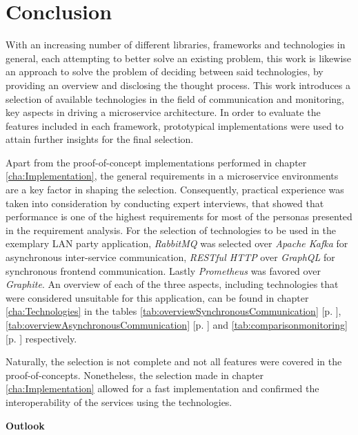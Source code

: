 
\chapter{Conclusion}\label{cha:Conclusion}

With an increasing number of different libraries, frameworks and technologies in general, each attempting to better solve an existing problem, this work is likewise an approach to solve the problem of deciding between said technologies, by providing an overview and disclosing the thought process.
This work introduces a selection of available technologies in the field of communication and monitoring, key aspects in driving a microservice architecture.
In order to evaluate the features included in each framework, prototypical implementations were used to attain further insights for the final selection.

Apart from the proof-of-concept implementations performed in chapter \ref{cha:Implementation}, the general requirements in a microservice environments are a key factor in shaping the selection.
Consequently, practical experience was taken into consideration by conducting expert interviews, that showed that performance is one of the highest requirements for most of the personas presented in the requirement analysis.
For the selection of technologies to be used in the exemplary LAN party application, \textit{RabbitMQ} was selected over \textit{Apache Kafka} for asynchronous inter-service communication, \textit{RESTful HTTP} over \textit{GraphQL} for synchronous frontend communication.
Lastly \textit{Prometheus} was favored over \textit{Graphite}.
An overview of each of the three aspects, including technologies that were considered unsuitable for this application, can be found in chapter \ref{cha:Technologies} in the tables \ref{tab:overviewSynchronousCommunication} [p. \pageref{tab:overviewSynchronousCommunication}], \ref{tab:overviewAsynchronousCommunication} [p. \pageref{tab:overviewAsynchronousCommunication}] and \ref{tab:comparisonmonitoring} [p. \pageref{tab:overviewAsynchronousCommunication}] respectively.

Naturally, the selection is not complete and not all features were covered in the proof-of-concepts.
Nonetheless, the selection made in chapter \ref{cha:Implementation} allowed for a fast implementation and confirmed the interoperability of the services using the technologies.


\textbf{Outlook}

